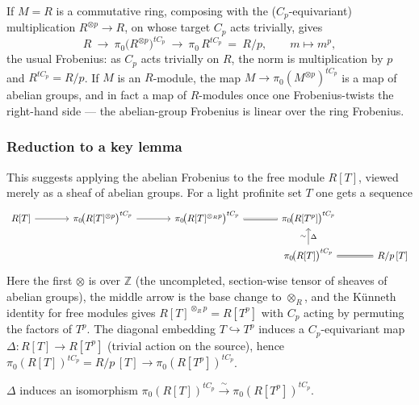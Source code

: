 If $M=R$ is a commutative ring, composing with the ($C_p$-equivariant)
multiplication $R^{\otimes p}\to R$, on whose target $C_p$ acts trivially, gives
\begin{equation*}
R\ \longrightarrow\ \pi_0\big(R^{\otimes p}\big)^{tC_p}\ \longrightarrow\ \pi_0\, R^{tC_p}\ =\ R/p,\qquad m\longmapsto m^p,
\end{equation*}
the usual Frobenius: as $C_p$ acts trivially on $R$, the norm is multiplication
by $p$ and $R^{tC_p}=R/p$. If $M$ is an $R$-module, the map $M\to\pi_0(M^{\otimes p})^{tC_p}$ is a
map of abelian groups, and in fact a map of $R$-modules once one Frobenius-twists
the right-hand side --- the abelian-group Frobenius is linear over the ring
Frobenius.

\subsubsection*{Reduction to a key lemma}

This suggests applying the abelian Frobenius to the free module $R[T]$, viewed
merely as a sheaf of abelian groups. For a light profinite set $T$ one gets a
sequence
\begin{equation}
\label{eq:13:frobenius-RT}
\begin{tikzcd}[column sep=large]
R[T] \arrow[r] & \pi_0\!\big(R[T]^{\otimes p}\big)^{tC_p} \arrow[r] & \pi_0\!\big(R[T]^{\otimes_R p}\big)^{tC_p} \arrow[r, equal] & \pi_0\!\big(R[T^p]\big)^{tC_p} \\
& & & \pi_0\!\big(R[T]\big)^{tC_p} \arrow[u, "\Delta"', "\sim"] \arrow[r, equal] & R/p\,[T]
\end{tikzcd}
\end{equation}
Here the first $\otimes$ is over $\mathbb Z$ (the uncompleted, section-wise tensor
of sheaves of abelian groups), the middle arrow is the base change to
$\otimes_R$, and the K\"unneth identity for free modules gives
$R[T]^{\otimes_R p}=R[T^p]$ with $C_p$ acting by permuting the factors of $T^p$.
The diagonal embedding $T\hookrightarrow T^p$ induces a $C_p$-equivariant map
$\Delta\colon R[T]\to R[T^p]$ (trivial action on the source), hence
$\pi_0(R[T])^{tC_p}=R/p\,[T]\to\pi_0(R[T^p])^{tC_p}$.

\begin{claim}
\label{claim:13:delta-iso}
$\Delta$ induces an isomorphism $\pi_0(R[T])^{tC_p}\xrightarrow{\ \sim\ }\pi_0(R[T^p])^{tC_p}$.
\end{claim}

